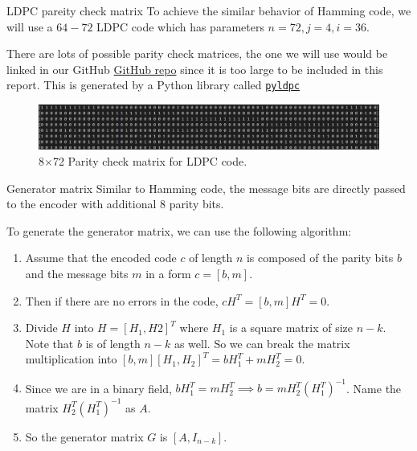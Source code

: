 \documentclass{beamer}
\begin{document}
\begin{frame}{LDPC pareity check matrix}
    To achieve the similar behavior of Hamming code, we will use a $64-72$ LDPC code which has parameters $n=72, j=4, i=36$.

    There are lots of possible parity check matrices, the one we will use would be linked in our GitHub \href{https://hichamjanati.github.io/pyldpc/}{GitHub repo} since it is too large to be included in this report. This is generated by a Python library called \href{https://hichamjanati.github.io/pyldpc/}{\texttt{pyldpc}}

    \begin{figure}[htbp]
      \centerline{\includegraphics[scale = 0.4]{Images/LDPC_Parity_Matrix.jpg}}
      \caption{8$\times$72 Parity check matrix for LDPC code.}
  \end{figure}
    
\end{frame}

\begin{frame}{Generator matrix}
    Similar to Hamming code, the message bits are directly passed to the encoder with additional 8 parity bits.

    To generate the generator matrix, we can use the following algorithm:
    \begin{enumerate}
      \item Assume that the encoded code $c$ of length $n$ is composed of the parity bits
            $b$ and the message bits $m$ in a form $c = [b, m]$.
      \item Then if there are no errors in the code, $cH^T = [b, m]H^T = 0$.
      \item Divide $H$ into $H = [H_1, H2]^T$ where $H_1$ is a square matrix of size $n-k$.
            Note that $b$ is of length $n-k$ as well. So we can break the matrix
            multiplication into $[b, m][H_1, H_2]^T = bH_1^T + mH_2^T = 0$.
      \item Since we are in a binary field, $bH_1^T = mH_2^T \implies b =
              mH_2^T(H_1^T)^{-1}$. Name the matrix $H_2^T(H_1^T)^{-1}$ as $A$.
      \item So the generator matrix $G$ is $[A, I_{n-k}]$.
    \end{enumerate}
\end{frame}
\end{document}
